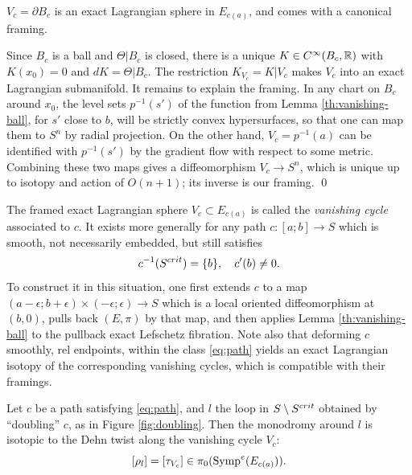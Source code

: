 \documentclass[10pt,letterpaper]{article}
\begin{document}
\begin{lemma} \label{th:vanishing-cycle}
$V_c = \partial B_c$ is an exact Lagrangian sphere in $E_{c(a)}$, and comes
with a canonical framing.
\end{lemma}

\proof Since $B_c$ is a ball and $\Theta|B_c$ is closed, there is a unique $K
\in C^\infty(B_c,\mathbb{R})$ with $K(x_0) = 0$ and $dK = \Theta|B_c$. The restriction
$K_{V_c} = K|V_c$ makes $V_c$ into an exact Lagrangian submanifold. It remains
to explain the framing. In any chart on $B_c$ around $x_0$, the level sets
$p^{-1}(s')$ of the function from Lemma \ref{th:vanishing-ball}, for $s'$ close
to $b$, will be strictly convex hypersurfaces, so that one can map them to
$S^n$ by radial projection. On the other hand, $V_c = p^{-1}(a)$ can be
identified with $p^{-1}(s')$ by the gradient flow with respect to some metric.
Combining these two maps gives a diffeomorphism $V_c \rightarrow S^n$, which is
unique up to isotopy and action of $O(n+1)$; its inverse is our framing. \qed

The framed exact Lagrangian sphere $V_c \subset E_{c(a)}$ is called the {\em
vanishing cycle} associated to $c$. It exists more generally for any path $c:
[a;b] \rightarrow S$ which is smooth, not necessarily embedded, but still
satisfies
\begin{equation} \label{eq:path}
c^{-1}(S^{crit}) = \{b\}, \quad c'(b) \neq 0.
\end{equation}
To construct it in this situation, one first extends $c$ to a map
$(a-\epsilon;b+\epsilon) \times (-\epsilon;\epsilon) \rightarrow S$ which is a
local oriented diffeomorphism at $(b,0)$, pulls back $(E,\pi)$ by that map, and
then applies Lemma \ref{th:vanishing-ball} to the pullback exact Lefschetz
fibration. Note also that deforming $c$ smoothly, rel endpoints, within the
class \eqref{eq:path} yields an exact Lagrangian isotopy of the corresponding
vanishing cycles, which is compatible with their framings.

%
%
\begin{prop} \label{th:picard-lefschetz}
Let $c$ be a path satisfying \eqref{eq:path}, and $l$ the loop in $S \setminus
S^{crit}$ obtained by ``doubling'' $c$, as in Figure \ref{fig:doubling}. Then
the monodromy around $l$ is isotopic to the Dehn twist along the vanishing
cycle $V_c$:
\begin{equation} \label{eq:picard-lefschetz}
[\rho_l] = [\tau_{V_c}] \in \pi_0(\mathrm{Symp}^e(E_{c(a)})).
\end{equation}
\end{prop}
\end{document}
